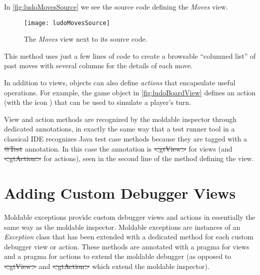 \documentclass[sigplan,screen]{acmart} %
\newcommand*{\smallimg}[1]{%
    \raisebox{-.3\baselineskip}{%
        \texttt{[image: \#1]}%
    }%
}
\newcommand\ac[1]{\nbc{AC}{#1}{teal}}
\begin{document}
In \autoref{fig:ludoMovesSource} we see the source code defining the \emph{Moves} view.
\begin{figure}[h]
  \texttt{[image: ludoMovesSource]}
  \caption{The \emph{Moves} view next to its source code.}
  \label{fig:ludoMovesSource}
\end{figure}
This method uses just a few lines of code to create a browsable ``columned list'' of past moves with several columns for the details of each move.

In addition to views, objects can also define \emph{actions} that encapsulate useful operations.
For example, the game object in \autoref{fig:ludoBoardView} defines an  action (with the icon \smallimg{ludoPlayActionIcon}) that can be used to simulate a player's turn.


View and action methods are recognized by the moldable inspector through dedicated annotations, in exactly the same way that a test runner tool in a classical IDE recognizes Java test case methods because they are tagged with a \st{@Test} annotation.
In this case the annotation is \st{<gtView>} for views (and \st{<gtAction>} for actions), seen in the second line of the method defining the view.

\section{Adding Custom Debugger Views}\label{sec:views}

Moldable exceptions provide custom debugger views and actions in essentially the same way as the moldable inspector.
Moldable exceptions are instances of an \emph{Exception} class that has been extended with a dedicated method for each custom debugger view or action.
These methods are annotated with a  pragma for views and a  pragma for actions to extend the moldable debugger
(\ie as opposed to \st{<gtView>} and  \st{<gtAction>} which extend the moldable inspector).
\end{document}

